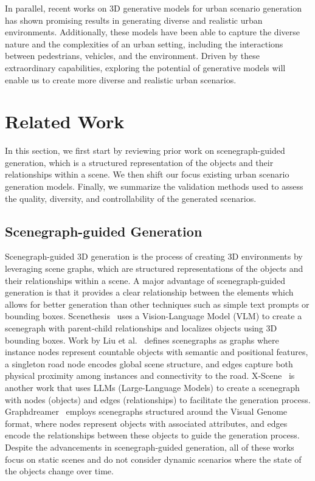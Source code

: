 \documentclass{article}
\begin{document}
In parallel, recent works on 3D generative models for urban scenario generation has shown promising results in generating diverse and realistic urban environments. Additionally, these models have been able to capture the diverse nature and the complexities of an urban setting, including the interactions between pedestrians, vehicles, and the environment. Driven by these extraordinary capabilities, exploring the potential of generative models will enable us to create more diverse and realistic urban scenarios.

\section{Related Work}

In this section, we first start by reviewing prior work on scenegraph-guided generation, which is a structured representation of the objects and their relationships within a scene. We then shift our focus existing urban scenario generation models. Finally, we summarize the validation methods used to assess the quality, diversity, and controllability of the generated scenarios.

\subsection{Scenegraph-guided Generation}

Scenegraph-guided 3D generation is the process of creating 3D environments by leveraging scene graphs, which are structured representations of the objects and their relationships within a scene. A major advantage of scenegraph-guided generation is that it provides a clear relationship between the elements which allows for better generation than other techniques such as simple text prompts or bounding boxes. Scenethesis~\cite{ling2025scenethesis} uses a Vision-Language Model (VLM) to create a scenegraph with parent-child relationships and localizes objects using 3D bounding boxes. Work by Liu et al.~\cite{liu2025controllable} defines scenegraphs as graphs where instance nodes represent countable objects with semantic and positional features, a singleton road node encodes global scene structure, and edges capture both physical proximity among instances and connectivity to the road. X-Scene~\cite{yang2025x} is another work that uses LLMs (Large-Language Models) to create a scenegraph with nodes (objects) and edges (relationships) to facilitate the generation process. Graphdreamer~\cite{gao2024graphdreamer} employs scenegraphs structured around the Visual Genome~\cite{krishna2017visual} format, where nodes represent objects with associated attributes, and edges encode the relationships between these objects to guide the generation process. Despite the advancements in scenegraph-guided generation, all of these works focus on static scenes and do not consider dynamic scenarios where the state of the objects change over time.
\end{document}
